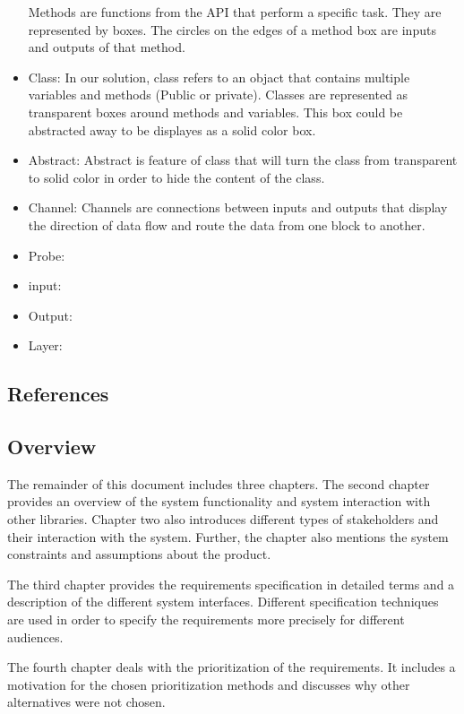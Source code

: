 \documentclass[a4paper,10pt]{article} \usepackage[margin=1.0in]{geometry} \usepackage{pdfpages} \usepackage{graphicx}
\begin{document}
\begin{itemize}
		Methods are functions from the API that perform a specific task. They are represented by boxes.
		The circles on the edges of a method box are inputs and outputs of that method.
	\item Class: 
		In our solution, class refers to an objact that contains multiple variables and methods (Public or private).
		Classes are represented as transparent boxes around methods and variables. This box could be abstracted away to be displayes as a solid color box.
	\item Abstract:
		Abstract is feature of class that will turn the class from transparent to solid color in order to hide the content of the class.
	\item Channel:
		 Channels are connections between inputs and outputs that display the direction of data flow and route the data from one block to another. 
	\item Probe:
		  
	\item input:
		
	\item Output:
		
	\item Layer:
\end{itemize}
\subsection{References}
\subsection{Overview}

The remainder of this document includes three chapters. 
The second chapter provides an overview of the system functionality and system interaction with other libraries. 
Chapter two also introduces different types of stakeholders and their interaction with the system. 
Further, the chapter also mentions the system constraints and assumptions about the product.

The third chapter provides the requirements specification in detailed terms and a description of the different system interfaces. 
Different specification techniques are used in order to specify the requirements more precisely for different audiences.

The fourth chapter deals with the prioritization of the requirements. 
It includes a motivation for the chosen prioritization methods and discusses why other alternatives were not chosen.
\end{document}
